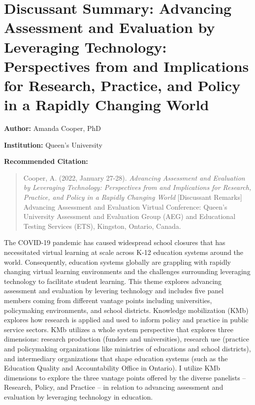 \documentclass[
]{book}
\begin{document}
\newpage

\hypertarget{discussant-summary-advancing-assessment-and-evaluation-by-leveraging-technology-perspectives-from-and-implications-for-research-practice-and-policy-in-a-rapidly-changing-world}{%
\section{Discussant Summary: Advancing Assessment and Evaluation by Leveraging Technology: Perspectives from and Implications for Research, Practice, and Policy in a Rapidly Changing World}\label{discussant-summary-advancing-assessment-and-evaluation-by-leveraging-technology-perspectives-from-and-implications-for-research-practice-and-policy-in-a-rapidly-changing-world}}

\textbf{Author:} Amanda Cooper, PhD

\textbf{Institution:} Queen's University

\textbf{Recommended Citation:}

\begin{quote}
Cooper, A. (2022, January 27-28). \emph{Advancing Assessment and Evaluation by Leveraging Technology: Perspectives from and Implications for Research, Practice, and Policy in a Rapidly Changing World} {[}Discussant Remarks{]} Advancing Assessment and Evaluation Virtual Conference: Queen's University Assessment and Evaluation Group (AEG) and Educational Testing Services (ETS), Kingston, Ontario, Canada.
\end{quote}

The COVID-19 pandemic has caused widespread school closures that has necessitated virtual learning at scale across K-12 education systems around the world. Consequently, education systems globally are grappling with rapidly changing virtual learning environments and the challenges surrounding leveraging technology to facilitate student learning. This theme explores advancing assessment and evaluation by levering technology and includes five panel members coming from different vantage points including universities, policymaking environments, and school districts. Knowledge mobilization (KMb) explores how research is applied and used to inform policy and practice in public service sectors. KMb utilizes a whole system perspective that explores three dimensions: research production (funders and universities), research use (practice and policymaking organizations like ministries of educations and school districts), and intermediary organizations that shape education systems (such as the Education Quality and Accountability Office in Ontario). I utilize KMb dimensions to explore the three vantage points offered by the diverse panelists --Research, Policy, and Practice -- in relation to advancing assessment and evaluation by leveraging technology in education.
\end{document}

